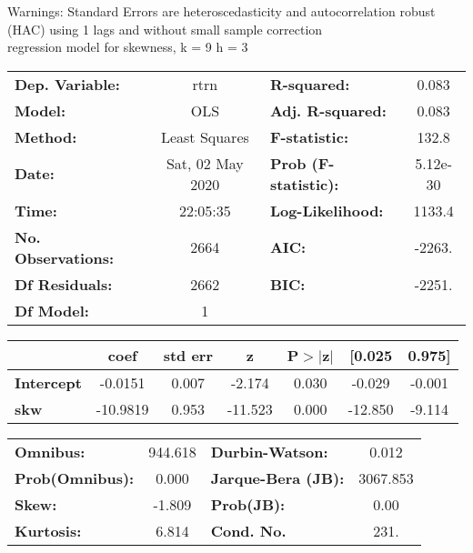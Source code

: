 Warnings: \newline
 [1] Standard Errors are heteroscedasticity and autocorrelation robust (HAC) using 1 lags and without small sample correction\\ 

regression model for skewness, k = 9 h = 3\begin{center}
\begin{tabular}{lclc}
\toprule
\textbf{Dep. Variable:}    &       rtrn       & \textbf{  R-squared:         } &     0.083   \\
\textbf{Model:}            &       OLS        & \textbf{  Adj. R-squared:    } &     0.083   \\
\textbf{Method:}           &  Least Squares   & \textbf{  F-statistic:       } &     132.8   \\
\textbf{Date:}             & Sat, 02 May 2020 & \textbf{  Prob (F-statistic):} &  5.12e-30   \\
\textbf{Time:}             &     22:05:35     & \textbf{  Log-Likelihood:    } &    1133.4   \\
\textbf{No. Observations:} &        2664      & \textbf{  AIC:               } &    -2263.   \\
\textbf{Df Residuals:}     &        2662      & \textbf{  BIC:               } &    -2251.   \\
\textbf{Df Model:}         &           1      & \textbf{                     } &             \\
\bottomrule
\end{tabular}
\begin{tabular}{lcccccc}
                   & \textbf{coef} & \textbf{std err} & \textbf{z} & \textbf{P$> |$z$|$} & \textbf{[0.025} & \textbf{0.975]}  \\
\midrule
\textbf{Intercept} &      -0.0151  &        0.007     &    -2.174  &         0.030        &       -0.029    &       -0.001     \\
\textbf{skw}       &     -10.9819  &        0.953     &   -11.523  &         0.000        &      -12.850    &       -9.114     \\
\bottomrule
\end{tabular}
\begin{tabular}{lclc}
\textbf{Omnibus:}       & 944.618 & \textbf{  Durbin-Watson:     } &    0.012  \\
\textbf{Prob(Omnibus):} &   0.000 & \textbf{  Jarque-Bera (JB):  } & 3067.853  \\
\textbf{Skew:}          &  -1.809 & \textbf{  Prob(JB):          } &     0.00  \\
\textbf{Kurtosis:}      &   6.814 & \textbf{  Cond. No.          } &     231.  \\
\bottomrule
\end{tabular}
\end{center}

